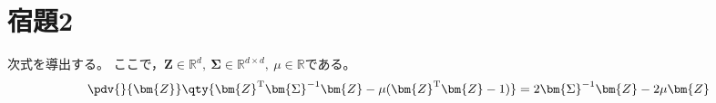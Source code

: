 \documentclass[class=jsarticle, crop=false, dvipdfmx, fleqn]{standalone}
\begin{document}
\section*{宿題2}


\begin{comment}
\subsection*{問題1}

\(x\)が正規分布に従うとき，
\(y = x^2\)を考えると，
\(x\)と\(y\)は無相関であることと，
独立ではないことを示す。




\subsection*{問題2}
\end{comment}


次式を導出する。
ここで，\(\bm{Z} \in \mathbb{R}^d,\ \bm{\Sigma} \in \mathbb{R}^{d \times d},\ \mu \in \mathbb{R}\)である。
\begin{equation}
    \pdv{}{\bm{Z}} \qty{\bm{Z}^\mathrm{T} \bm{\Sigma}^{-1} \bm{Z} - \mu(\bm{Z}^\mathrm{T}\bm{Z} - 1)} = 2 \bm{\Sigma}^{-1} \bm{Z} - 2\mu\bm{Z}
\end{equation}
\end{document}
